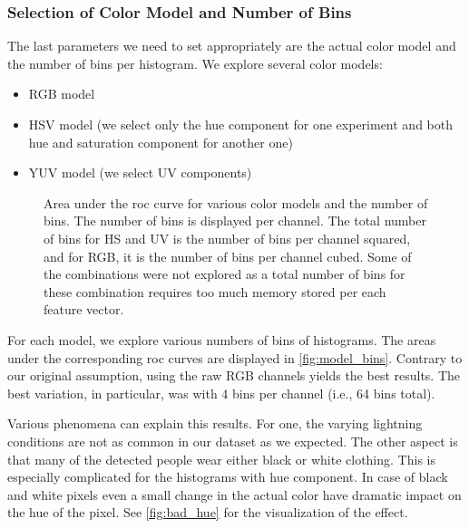 \subsubsection{Selection of Color Model and Number of Bins}

The last parameters we need to set appropriately are the actual color model
and the number of bins per histogram. We explore several color models:

\begin{itemize}
    \item RGB model
    \item HSV model (we select only the hue component for one experiment and both hue and saturation component for another one)
    \item YUV model (we select UV components)
\end{itemize}

\begin{figure}
    \centering
    \def\svgwidth{\columnwidth}
    \Large
    \scalebox{0.7}{}
    \caption[Area under the ROC curve for various color models and the number of bins]{Area under the \gls{roc} curve for various color models and the number of bins. The number of bins is displayed per channel. The total number of bins for HS and UV is the number of bins per channel squared, and for RGB, it is the number of bins per channel cubed. Some of the combinations were not explored as a total number of bins for these combination requires too much memory stored per each feature vector.}
    \label{fig:model_bins}
\end{figure}

For each model, we explore various numbers of bins of histograms. The areas under the corresponding \gls{roc} curves are displayed in \autoref{fig:model_bins}. Contrary to our original assumption, using the raw RGB channels yields the best results. The best variation, in particular, was with 4 bins per channel (i.e., 64 bins total).

Various phenomena can explain this results. For one, the varying lightning
conditions are not as common in our dataset as we expected. The other aspect is that many of the detected people wear either black or white clothing. This is especially complicated for the histograms with hue component. In case of black and white pixels even a small change in the actual color have dramatic impact on the hue of the pixel. See \autoref{fig:bad_hue} for the visualization of the effect. 

